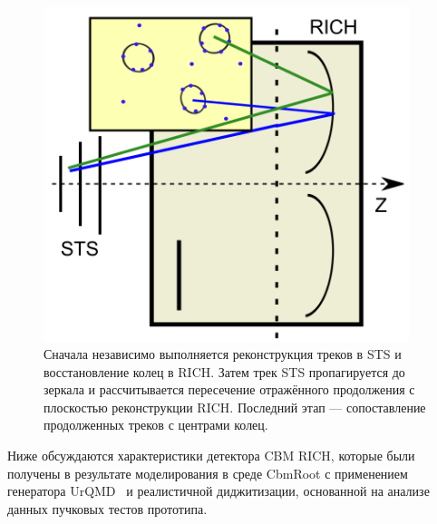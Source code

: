 \begin{figure}[H]
\centering
\includegraphics[width=0.95\textwidth]{pictures/STS_RICH_reco.png}
\caption{Сначала независимо выполняется реконструкция треков в STS и восстановление колец в RICH. Затем трек STS пропагируется до зеркала и рассчитывается пересечение отражённого продолжения с плоскостью реконструкции RICH. Последний этап --- сопоставление продолженных треков с центрами колец.}
\label{fig:StsRichReco}
\end{figure}


Ниже обсуждаются характеристики детектора CBM RICH, которые были получены в результате моделирования в среде CbmRoot с применением генератора UrQMD~\cite{URQMD} и реалистичной диджитизации, основанной на анализе данных пучковых тестов прототипа.

